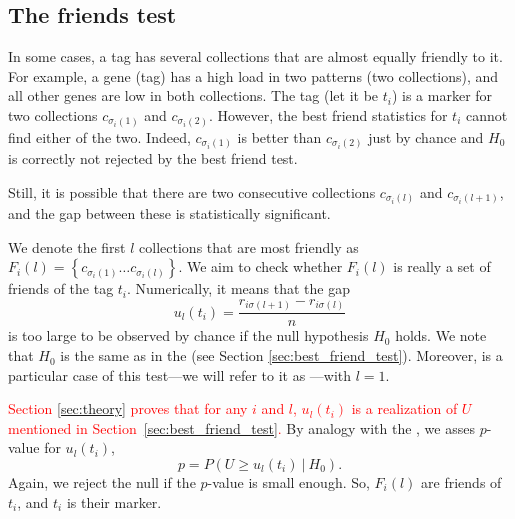 \documentclass{llncs}
\begin{document}
\subsection{The friends test}
\label{sec:friends_test}

In some cases, a tag has several collections that are almost equally friendly to it. 
For example, a gene (tag) has a high load in two patterns (two collections), and all other genes are low in both collections. The tag (let it be $t_i$) is a marker for two collections $c_{\sigma_{i}(1)}$ and $c_{\sigma_{i}(2)}$. However, the best friend statistics for $t_i$ cannot find either of the two. 
Indeed, $c_{\sigma_{i}(1)}$ is better than $c_{\sigma_{i}(2)}$ just by chance and $H_0$ is correctly not rejected by the best friend test.

Still, it is possible that there are two consecutive collections $c_{\sigma_i(l)}$ and $c_{\sigma_i(l+1)}$, and the gap between these is statistically significant.

We denote the first $l$ collections that are most friendly as $F_{i}(l) = \left\{ c_{\sigma_i(1)} \dots c_{\sigma_i(l)} \right\}$.
We aim to check whether $F_{i}(l)$ is really a set of friends of the tag $t_i$. Numerically, it means that the gap 
\begin{equation}
\label{def:u_l}
u_{l}(t_i) = \frac{r_{i\sigma(l+1)} - r_{i\sigma(l)}}{n}
\end{equation}
is too large to be observed by chance if the null hypothesis $H_0$ holds. We note that $H_0$ is the same as in the  (see Section \ref{sec:best_friend_test}).
Moreover,  is a particular case of
this test---we will refer to it as ---with $l = 1$.


\textcolor{red}{Section \ref{sec:theory} proves that for any $i$ and $l$, $u_l(t_i)$ is a realization of $U$ mentioned in Section~\ref{sec:best_friend_test}.}
By analogy with the , we asses $p$-value for $u_{l}(t_i)$,
\[
p = P\left(U \ge u_l(t_i)~|~H_0\right). 
\]
Again, we reject the null if the $p$-value is small enough. So, $F_{i}(l)$ are friends of $t_i$, and $t_i$ is their marker.
\end{document}
